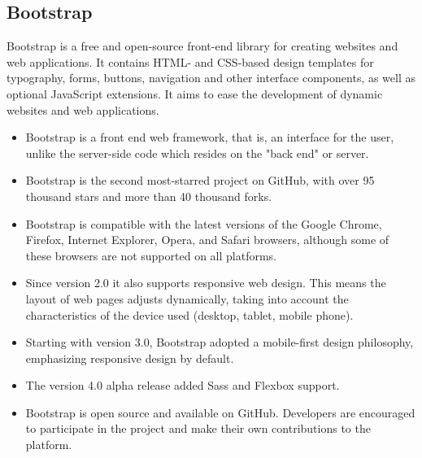 \subsection{Bootstrap}
\par Bootstrap is a free and open-source front-end library for creating websites and web applications. It contains HTML- and CSS-based design templates for typography, forms, buttons, navigation and other interface components, as well as optional JavaScript extensions. It aims to ease the development of dynamic websites and web applications.\cite{bootstrap}
\begin{itemize}
\item Bootstrap is a front end web framework, that is, an interface for the user, unlike the server-side code which resides on the "back end" or server.
\item Bootstrap is the second most-starred project on GitHub, with over 95 thousand stars and more than 40 thousand forks.
\item Bootstrap is compatible with the latest versions of the Google Chrome, Firefox, Internet Explorer, Opera, and Safari browsers, although some of these browsers are not supported on all platforms.
\item Since version 2.0 it also supports responsive web design. This means the layout of web pages adjusts dynamically, taking into account the characteristics of the device used (desktop, tablet, mobile phone).
\item Starting with version 3.0, Bootstrap adopted a mobile-first design philosophy, emphasizing responsive design by default.
\item The version 4.0 alpha release added Sass and Flexbox support.
\item Bootstrap is open source and available on GitHub. Developers are encouraged to participate in the project and make their own contributions to the platform.
\end{itemize}

